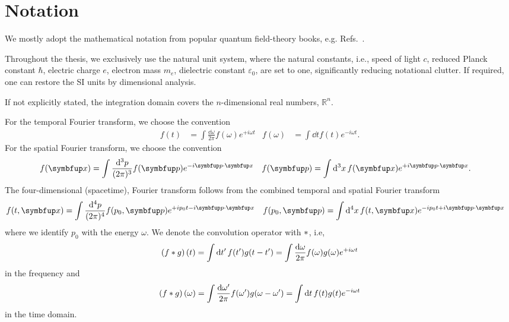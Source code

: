 \section*{Notation}

We mostly adopt the mathematical notation from popular quantum field-theory books, e.g. Refs.~\cite{Weinberg1995,Peskin1995}.

Throughout the thesis, we exclusively use the natural unit system, where the natural constants, i.e., speed of light $c$, reduced Planck constant $\hbar$, electric charge $e$, electron mass $m_e$, dielectric constant $\varepsilon_0$, are set to one, significantly reducing notational clutter.
If required, one can restore the SI units by dimensional analysis.

If not explicitly stated, the integration domain covers the $n$-dimensional real numbers, $\mathbb{R}^n$.

For the temporal Fourier transform, we choose the convention
\begin{align*}
	f(t)
	&=
	\int\frac{\dd{\omega}}{2\pi}
	f(\omega)
	e^{+i\omega t}
	&
	f(\omega)
	&=
	\int\dd{t}
	f(t)
	e^{-i\omega t}
	.
\end{align*}
For the spatial Fourier transform, we choose the convention
\begin{align*}
	f(\vb{x})
	&=
	\int\frac{\dd[3]{p}}{(2\pi)^3}
	f(\vb{p})
	e^{-i\vb{p}\vdot\vb{x}}
	&
	f(\vb{p})
	&=
	\int\dd[3]{x}
	f(\vb{x})
	e^{+i\vb{p}\vdot\vb{x}}
	.
\end{align*}
The four-dimensional (spacetime), Fourier transform follows from the combined temporal and spatial Fourier transform
\begin{align*}
	f(t,\vb{x})
	&=
	\int\frac{\dd[4]{p}}{(2\pi)^4}
	f(p_0,\vb{p})
	e^{+ip_0 t-i\vb{p}\vdot\vb{x}}
	&
	f(p_0,\vb{p})
	&=
	\int\dd[4]{x}
	f(t,\vb{x})
	e^{-ip_0 t+i\vb{p}\vdot\vb{x}}
\end{align*}
where we identify $p_0$ with the energy $\omega$.
We denote the convolution operator with $\ast$, i.e,
\begin{equation*}
	\left(f\conv g\right)(t)
	=
	\int\dd{t^\prime}
	f(t^\prime)
	g(t-t^\prime)
	=
	\int\frac{\dd{\omega}}{2\pi}
	f(\omega)
	g(\omega)
	e^{+i\omega t}
\end{equation*}
in the frequency and
\begin{equation*}
	\left(f\conv g\right)(\omega)
	=
	\int\frac{\dd{\omega^\prime}}{2\pi}
	f(\omega^\prime)
	g(\omega-\omega^\prime)
	=
	\int\dd{t}
	f(t)
	g(t)
	e^{-i\omega t}
\end{equation*}
in the time domain.

